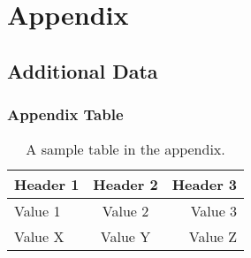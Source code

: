 \chapter{Appendix}
\lipsum[7-8]

\section{Additional Data}
\lipsum[9]

\subsection{Appendix Table}
\begin{table}[ht]
    \centering
    \begin{tabular}{lcr}
    \toprule
    Header 1 & Header 2 & Header 3 \\
    \midrule
    Value 1  & Value 2  & Value 3  \\
    Value X  & Value Y  & Value Z  \\
    \bottomrule
    \end{tabular}
    \caption{A sample table in the appendix.}
\end{table}

\lipsum[10]